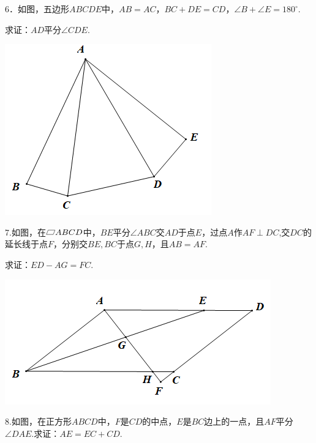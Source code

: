 \documentclass[10pt]{ctexart}
\newcommand*\pxsbx{%
	\mathord{\text{%
			\tikz[baseline]
			\draw (0,.1ex) -- (.8em,.1ex) -- (1em,1.4ex) -- (.2em,1.4ex) -- cycle;}}}
\begin{document}
\begin{shaded}
6．如图，五边形$ABCDE$中，$AB=AC$，$BC+DE=CD$，$\angle B+\angle E=180^\circ$.

求证：$AD$平分$\angle CDE$.
\end{shaded}

\begin{flushright}
	\includegraphics[scale=0.6]{figure/jiechangbuduan09}
\end{flushright}

\begin{shaded}
7.如图，在$\pxsbx ABCD$中，$BE$平分$\angle ABC$交$AD$于点$E$，过点$A$作$AF\perp DC$,交$DC$的延长线于点$F$，分别交$BE,BC$于点$G,H$，且$AB=AF$.

求证：$ED-AG=FC$.
\end{shaded}

\begin{flushright}
	\includegraphics[scale=0.6]{figure/jiechangbuduan10}
\end{flushright}

\begin{shaded}
8.如图，在正方形$ABCD$中，$F$是$CD$的中点，$E$是$BC$边上的一点，且$AF$平分$\angle DAE$.求证：$AE=EC+CD$.
\end{shaded}
\end{document}
